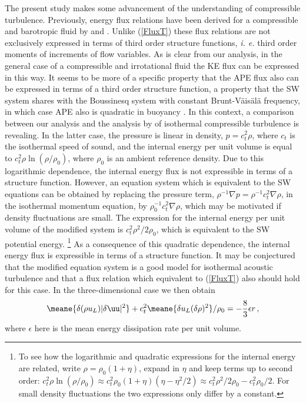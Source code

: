  The present study makes some advancement of the understanding of compressible turbulence. Previously, energy flux relations  have 
 been derived  for a compressible and barotropic fluid by \cite{Falkovich2010} and \cite{Galtier2011}.  Unlike (\ref{FluxT}) these flux relations are not exclusively expressed in terms of third order structure functions, {\em i. e.} third order moments of increments of flow variables. 
As is clear from our analysis, in the general case of a compressible and irrotational fluid the KE flux can be expressed in this way.  It seems to be more of a specific property that the APE flux also can be expressed in terms of a third order structure function, a property that the SW system shares with the Boussinesq system with constant Brunt-V\"ais\"al\"a frequency, in which case APE also is quadratic in buoyancy \cite[]{Augier2012}. 
In this context,  a comparison between our analysis and the analysis  by \cite{Galtier2011} of  isothermal compressible turbulence  is revealing. In the latter case, the pressure is linear in density, $ p = c_t^2 \rho $, where $ c_t $ is the isothermal speed of sound, and the internal energy per unit volume is  equal to $ c_t^2 \rho \ln (\rho/ \rho_0) $, where $ \rho_0 $ is an ambient reference density. Due to this  logarithmic dependence, the internal energy flux is not expressible in terms of a structure function. However, an equation system which is equivalent to the SW equations can be obtained by replacing the pressure term, $ \rho^{-1} \nabla p = \rho^{-1} c_t^{2} \nabla \rho $, in the isothermal momentum equation, by $ \rho_{0}^{-1} c_t^{2} \nabla \rho $, which may be motivated if density fluctuations are small. The expression for the internal energy per unit volume of the modified system is  $ c_t^2 \rho^2/2\rho_{0} $, which is equivalent to the SW potential energy. \footnote{To see how the logarithmic and quadratic expressions for the internal energy are 
 related, write $ \rho = \rho_0(1+\eta) $, expand in $ \eta $ and keep  terms up to second order: 
 $ c_t^2\rho \ln(\rho/\rho_0) \approx c_t^2 \rho_0(1+\eta)(\eta - \eta^2/2) \approx   c_t^2 \rho^2/2 \rho_0 - c_t^2 \rho_0/2 $. 
For small density fluctuations the two expressions only differ by a constant.} As a consequence of this quadratic dependence, the internal energy flux is expressible in terms of a structure function. It may be conjectured that the modified equation system is a good model for isothermal acoustic turbulence and that a flux relation which  equivalent to (\ref{FluxT}) also should hold for this case. In the three-dimensional case we then obtain
 \begin{equation}
\meane{ \delta (\rho u_L)    |\delta \uu|^2  }
+ c_t^2\meane{ \delta u_L(\delta \rho)^2  } /\rho_0 = - \frac{8}{3} \epsilon r \, ,\label{eq_Kolmo3}
\end{equation}
where  $ \epsilon $ here is the mean energy dissipation rate per unit volume.  

